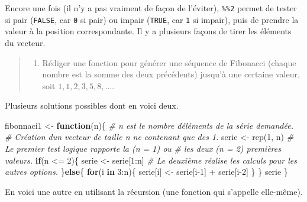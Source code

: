 \documentclass[
]{book}
\newenvironment{Shaded}{}{}
\newcommand{\CommentTok}[1]{\textit{#1}}
\newcommand{\ControlFlowTok}[1]{\textbf{#1}}
\newcommand{\DecValTok}[1]{#1}
\newcommand{\FunctionTok}[1]{#1}
\newcommand{\NormalTok}[1]{#1}
\newcommand{\OtherTok}[1]{#1}
\newcommand{\SpecialCharTok}[1]{#1}
\providecommand{\tightlist}{%
  \setlength{\itemsep}{0pt}\setlength{\parskip}{0pt}}
\begin{document}
Encore une fois (il n'y a pas vraiment de façon de l'éviter), \texttt{\%\%2} permet de tester si pair (\texttt{FALSE}, car \texttt{0} si pair) ou impair (\texttt{TRUE}, car \texttt{1} si impair), puis de prendre la valeur à la position correspondante. Il y a plusieurs façons de tirer les éléments du vecteur.

\begin{quote}
\begin{enumerate}
\def\labelenumi{\arabic{enumi}.}
\setcounter{enumi}{4}
\tightlist
\item
  Rédiger une fonction pour générer une séquence de Fibonacci (chaque nombre est la somme des deux précédents) jusqu'à une certaine valeur, soit \(1,1,2,3,5,8,...\).
\end{enumerate}
\end{quote}

Plusieurs solutions possibles dont en voici deux.

\begin{Shaded}
\begin{Highlighting}[]
\NormalTok{fibonnaci1 }\OtherTok{\textless{}{-}}  \ControlFlowTok{function}\NormalTok{(n)\{}
  \CommentTok{\# n est le nombre d\textquotesingle{}éléments de la série demandée.}
  \CommentTok{\# Création d\textquotesingle{}un vecteur de taille n ne contenant que des 1.}
\NormalTok{  serie }\OtherTok{\textless{}{-}} \FunctionTok{rep}\NormalTok{(}\DecValTok{1}\NormalTok{, n)}
  \CommentTok{\# Le premier test logique rapporte la (n = 1) ou }
  \CommentTok{\# les deux (n = 2) premières valeurs.}
  \ControlFlowTok{if}\NormalTok{(n }\SpecialCharTok{\textless{}=} \DecValTok{2}\NormalTok{)\{}
\NormalTok{    serie }\OtherTok{\textless{}{-}}\NormalTok{  serie[}\DecValTok{1}\SpecialCharTok{:}\NormalTok{n]}
    \CommentTok{\# Le deuxième réalise les calculs pour les autres options.  }
\NormalTok{  \}}\ControlFlowTok{else}\NormalTok{\{}
    \ControlFlowTok{for}\NormalTok{(i }\ControlFlowTok{in} \DecValTok{3}\SpecialCharTok{:}\NormalTok{n)\{}
\NormalTok{      serie[i] }\OtherTok{\textless{}{-}}\NormalTok{  serie[i}\DecValTok{{-}1}\NormalTok{] }\SpecialCharTok{+}\NormalTok{ serie[i}\DecValTok{{-}2}\NormalTok{]  }
\NormalTok{    \}}
\NormalTok{  \}}
\NormalTok{  serie}
\NormalTok{\}}
\end{Highlighting}
\end{Shaded}

En voici une autre en utilisant la récursion (une fonction qui s'appelle elle-même).
\end{document}

